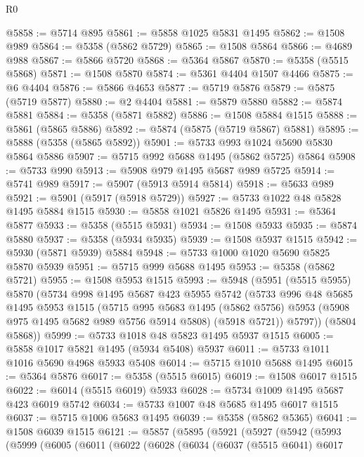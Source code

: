 \begin{lexlean}{R0}
\begin{coremodule}
@5858 := @5714 @895
@5861 := @5858 @1025 @5831 @1495
@5862 := @1508 @989
@5864 := @5358 (@5862 @5729)
@5865 := @1508 @5864
@5866 := @4689 @988
@5867 := @5866 @5720
@5868 := @5364 @5867
@5870 := @5358 (@5515 @5868)
@5871 := @1508 @5870
@5874 := @5361 @4404 @1507 @4466
@5875 := @6 @4404
@5876 := @5866 @4653
@5877 := @5719 @5876
@5879 := @5875 (@5719 @5877)
@5880 := @2 @4404
@5881 := @5879 @5880
@5882 := @5874 @5881
@5884 := @5358 (@5871 @5882)
@5886 := @1508 @5884 @1515
@5888 := @5861 (@5865 @5886)
@5892 := @5874 (@5875 (@5719 @5867) @5881)
@5895 := @5888 (@5358 (@5865 @5892))
@5901 := @5733 @993 @1024 @5690 @5830 @5864 @5886
@5907 := @5715 @992 @5688 @1495 (@5862 @5725) @5864
@5908 := @5733 @990
@5913 := @5908 @979 @1495 @5687 @989 @5725
@5914 := @5741 @989
@5917 := @5907 (@5913 @5914 @5814)
@5918 := @5633 @989
@5921 := @5901 (@5917 (@5918 @5729))
@5927 := @5733 @1022 @48 @5828 @1495 @5884 @1515
@5930 := @5858 @1021 @5826 @1495
@5931 := @5364 @5877
@5933 := @5358 (@5515 @5931)
@5934 := @1508 @5933
@5935 := @5874 @5880
@5937 := @5358 (@5934 @5935)
@5939 := @1508 @5937 @1515
@5942 := @5930 (@5871 @5939) @5884
@5948 := @5733 @1000 @1020 @5690 @5825 @5870 @5939
@5951 := @5715 @999 @5688 @1495
@5953 := @5358 (@5862 @5721)
@5955 := @1508 @5953 @1515
@5993 := @5948
    (@5951
      (@5515 @5955)
      @5870
      (@5734
        @998
        @1495
        @5687
        @423
        @5955
        @5742
        (@5733
          @996
          @48
          @5685
          @1495
          @5953
          @1515
          (@5715
            @995
            @5683
            @1495
            (@5862 @5756)
            @5953
            (@5908 @975 @1495 @5682 @989 @5756 @5914 @5808)
            (@5918 @5721))
          @5797))
      (@5804 @5868))
@5999 := @5733 @1018 @48 @5823 @1495 @5937 @1515
@6005 := @5858 @1017 @5821 @1495 (@5934 @5408) @5937
@6011 := @5733 @1011 @1016 @5690 @4968 @5933 @5408
@6014 := @5715 @1010 @5688 @1495
@6015 := @5364 @5876
@6017 := @5358 (@5515 @6015)
@6019 := @1508 @6017 @1515
@6022 := @6014 (@5515 @6019) @5933
@6028 := @5734 @1009 @1495 @5687 @423 @6019 @5742
@6034 := @5733 @1007 @48 @5685 @1495 @6017 @1515
@6037 := @5715 @1006 @5683 @1495
@6039 := @5358 (@5862 @5365)
@6041 := @1508 @6039 @1515
@6121 := @5857
    (@5895
      (@5921
        (@5927
          (@5942
            (@5993
              (@5999
                (@6005
                  (@6011
                    (@6022
                      (@6028
                        (@6034
                          (@6037
                            (@5515 @6041)
                            @6017

\end{coremodule}
\end{lexlean}
